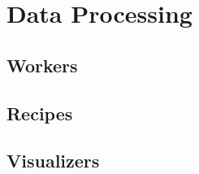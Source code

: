 \documentclass[a4paper]{article}
\begin{document}
\section{Data Processing}
\label{sec:data_processing}

\subsection{Workers}
\label{sec:data_processing_workers}

\subsection{Recipes}
\label{sec:data_processing_recipes}

\subsection{Visualizers}
\label{sec:data_processing_visualizers}




\clearpage

\printindex
\end{document}
